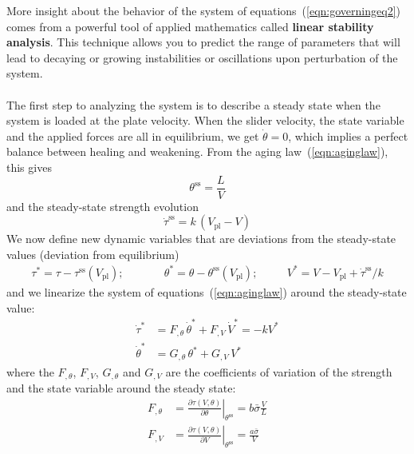 \documentclass[letterpaper,12pt,]{memoir}
\begin{document}
More insight about the behavior of the system of equations~(\ref{eqn:governingeq2}) comes from a powerful tool of applied mathematics called \textbf{linear stability analysis}. This technique allows you to predict the range of parameters that will lead to decaying or growing instabilities or oscillations upon perturbation of the system. \\
\\
The first step to analyzing the system is to describe a steady state when the system is loaded at the plate velocity. When the slider velocity, the state variable and the applied forces are all in equilibrium, we get $\dot{\theta}=0$, which implies a perfect balance between healing and weakening. From the aging law~(\ref{eqn:aginglaw}), this gives
\begin{equation} 
\theta^\text{ss}=\frac{L}{V}
\end{equation}
and the steady-state strength evolution
\begin{equation}
\dot{\tau}^\text{ss}=k\,(V_\text{pl}-V)
\end{equation}
We now define new dynamic variables that are deviations from the steady-state values (deviation from equilibrium)
\begin{equation}
\begin{aligned}
\tau^*=\tau-\tau^\text{ss}(V_\text{pl}); & \qquad & \theta^*=\theta-\theta^\text{ss}(V_\text{pl}); & \quad & V^*=V-V_\text{pl}+\dot{\tau}^\text{ss}/k
\end{aligned}
\end{equation}
and we linearize the system of equations~(\ref{eqn:aginglaw}) around the steady-state value:
\begin{equation}\label{eqn:linearized-system}
\begin{aligned}
\dot{\tau}^*&=F_{\!,\theta}\,\dot{\theta}^*+F_{\!,V}\,\dot{V}^*=-kV^*\\
\dot{\theta}^*&=G_{\!,\theta}\,\theta^*+G_{\!,V}\,V^*
\end{aligned}
\end{equation}
where the $F_{\!,\theta}$, $F_{\!,V}$, $G_{\!,\theta}$ and $G_{\!,V}$ are the coefficients of variation of the strength and the state variable around the steady state:
\begin{equation}
\begin{aligned}
F_{\!,\theta}&=\left.\frac{\partial\tau(V,\theta)}{\partial\theta}\right|_{\theta^\text{ss}}=b\bar{\sigma}\frac{V}{L}\\
F_{\!,V}&=\left.\frac{\partial\tau(V,\theta)}{\partial V}\right|_{\theta^\text{ss}}=\frac{a\bar{\sigma}}{V}
\end{aligned}
\end{equation}
\end{document}
